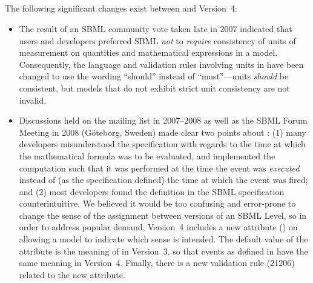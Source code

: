 \begin{blockChanged}

\renewcommand{\thesubsection}{\changed{\Alph{section}}.\changed{\arabic{subsection}}}

\subsection{}

The following significant changes exist between \sbmltwothree and
Version~4:
\begin{itemize}

\item The result of an SBML community vote taken late in 2007
  indicated that users and developers preferred SBML \emph{not} to
  \emph{require} consistency of units of measurement on quantities
  and mathematical expressions in a model.  Consequently, the
  language and validation rules involving units in \sbmltwofour
  have been changed to use the wording ``should'' instead of
  ``must''---units \emph{should} be consistent, but models that do
  not exhibit strict unit consistency are not invalid.

\item Discussions held on the
   mailing
  list in 2007--2008 as well as the SBML Forum Meeting in 2008
  (G\"{o}teborg, Sweden) made clear two points about
  \EventAssignment: (1) many developers misunderstood the
  specification with regards to the time at which the mathematical
  formula was to be evaluated, and implemented the computation
  such that it was performed at the time the event was
  \emph{executed} instead of (as the specification defined) the
  time at which the event was fired; and (2) most developers found
  the definition in the SBML specification counterintuitive.  We
  believed it would be too confusing and error-prone to change the
  sense of the assignment between versions of an SBML Level, so in
  order to address popular demand, Version~4 includes a new
  attribute () on \EventAssignment
  allowing a model to indicate which sense is intended.  The
  default value of the attribute is the meaning of
  \EventAssignment in Version~3, so that events as defined in
  \sbmltwothree have the same meaning in Version~4.  Finally,
  there is a new validation rule (21206) related to the new
  attribute.


\end{itemize}
\end{blockChanged}
